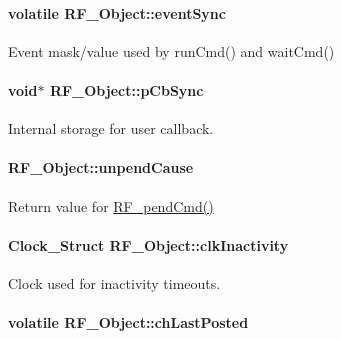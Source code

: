 \paragraph[{event\+Sync}]{ volatile R\+F\+\_\+\+Object\+::event\+Sync}\label{struct_r_f___object_a8379964e73b8969eb45fe49773eba235}


Event mask/value used by run\+Cmd() and wait\+Cmd() 

\paragraph[{p\+Cb\+Sync}]{\setlength{\rightskip}{0pt plus 5cm}void$\ast$ R\+F\+\_\+\+Object\+::p\+Cb\+Sync}\label{struct_r_f___object_ae3219bcfb65bacac26d30af83415863b}


Internal storage for user callback. 

\paragraph[{unpend\+Cause}]{ R\+F\+\_\+\+Object\+::unpend\+Cause}\label{struct_r_f___object_a41528750208c1e201b276509396e0a30}


Return value for \hyperlink{_r_f_8h_a91c1cb2508311f822acbc08ace568a83}{R\+F\+\_\+pend\+Cmd()} 

\paragraph[{clk\+Inactivity}]{\setlength{\rightskip}{0pt plus 5cm}Clock\+\_\+\+Struct R\+F\+\_\+\+Object\+::clk\+Inactivity}\label{struct_r_f___object_aaa9b100fc07809bd9086ffc44ebd4225}


Clock used for inactivity timeouts. 

\paragraph[{ch\+Last\+Posted}]{ volatile R\+F\+\_\+\+Object\+::ch\+Last\+Posted}\label{struct_r_f___object_a855d6435f6532e99b2e6d6e1675212ca}


